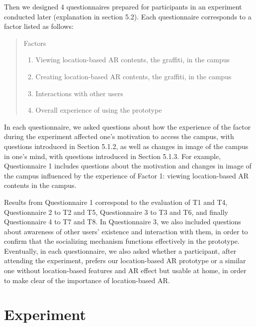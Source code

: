 Then we designed 4 questionnaires prepared for participants in an experiment conducted later (explanation in section 5.2). Each questionnaire corresponds to a factor listed as follows:

\begin{quote}
  Factors
  \begin{enumerate}
    \item Viewing location-based AR contents, the graffiti, in the campus
    \item Creating location-based AR contents, the graffiti, in the campus
    \item Interactions with other users
    \item Overall experience of using the prototype
  \end{enumerate}
\end{quote}

In each questionnaire, we asked questions about how the experience of the factor during the experiment affected one's motivation to access the campus, with questions introduced in Section 5.1.2, as well as changes in image of the campus in one's mind, with questions introduced in Section 5.1.3.
For example, Questionnaire 1 includes questions about the motivation and changes in image of the campus influenced by the experience of Factor 1: viewing location-based AR contents in the campus.

Results from Questionnaire 1 correspond to the evaluation of T1 and T4, Questionnaire 2 to T2 and T5, Questionnaire 3 to T3 and T6, and finally Questionnaire 4 to T7 and T8.
In Questionnaire 3, we also included questions about awareness of other users' existence and interaction with them, in order to confirm that the socializing mechanism functions effectively in the prototype.
Eventually, in each questionnaire, we also asked whether a participant, after attending the experiment, prefers our location-based AR prototype or a similar one without location-based features and AR effect but usable at home,
in order to make clear of the importance of location-based AR.

\section{Experiment}

